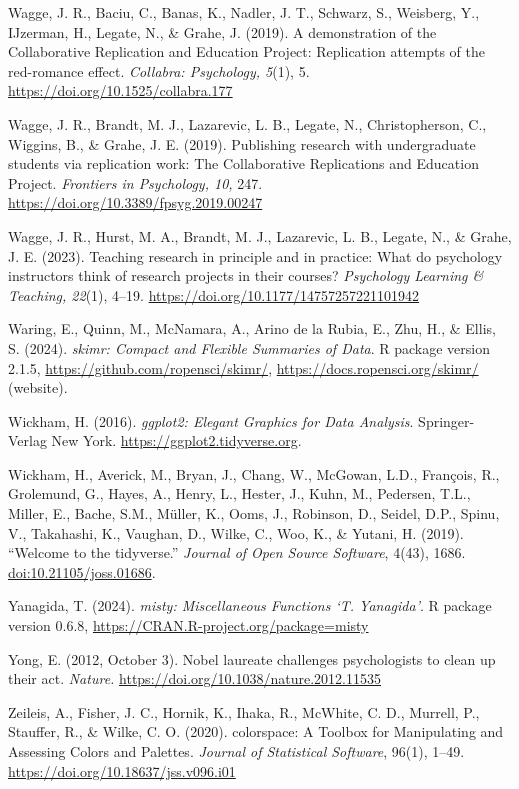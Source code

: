 \documentclass[
]{article}
\begin{document}
Wagge, J. R., Baciu, C., Banas, K., Nadler, J. T., Schwarz, S.,
Weisberg, Y., IJzerman, H., Legate, N., \& Grahe, J. (2019). A
demonstration of the Collaborative Replication and Education Project:
Replication attempts of the red-romance effect. \emph{Collabra:
Psychology, 5}(1), 5. \url{https://doi.org/10.1525/collabra.177}

Wagge, J. R., Brandt, M. J., Lazarevic, L. B., Legate, N.,
Christopherson, C., Wiggins, B., \& Grahe, J. E. (2019). Publishing
research with undergraduate students via replication work: The
Collaborative Replications and Education Project. \emph{Frontiers in
Psychology, 10,} 247. \url{https://doi.org/10.3389/fpsyg.2019.00247}

Wagge, J. R., Hurst, M. A., Brandt, M. J., Lazarevic, L. B., Legate, N.,
\& Grahe, J. E. (2023). Teaching research in principle and in practice:
What do psychology instructors think of research projects in their
courses? \emph{Psychology Learning \& Teaching, 22}(1), 4--19.
\url{https://doi.org/10.1177/14757257221101942}

Waring, E., Quinn, M., McNamara, A., Arino de la Rubia, E., Zhu, H., \&
Ellis, S. (2024). \emph{skimr: Compact and Flexible Summaries of Data}.
R package version 2.1.5, \url{https://github.com/ropensci/skimr/},
\url{https://docs.ropensci.org/skimr/} (website).

Wickham, H. (2016). \emph{ggplot2: Elegant Graphics for Data Analysis}.
Springer-Verlag New York. \url{https://ggplot2.tidyverse.org}.

Wickham, H., Averick, M., Bryan, J., Chang, W., McGowan, L.D., François,
R., Grolemund, G., Hayes, A., Henry, L., Hester, J., Kuhn, M., Pedersen,
T.L., Miller, E., Bache, S.M., Müller, K., Ooms, J., Robinson, D.,
Seidel, D.P., Spinu, V., Takahashi, K., Vaughan, D., Wilke, C., Woo, K.,
\& Yutani, H. (2019). ``Welcome to the tidyverse.'' \emph{Journal of
Open Source Software}, 4(43), 1686. \url{doi:10.21105/joss.01686}.

Yanagida, T. (2024). \emph{misty: Miscellaneous Functions `T.
Yanagida'}. R package version 0.6.8,
\url{https://CRAN.R-project.org/package=misty}

Yong, E. (2012, October 3). Nobel laureate challenges psychologists to
clean up their act. \emph{Nature.}
\url{https://doi.org/10.1038/nature.2012.11535}

Zeileis, A., Fisher, J. C., Hornik, K., Ihaka, R., McWhite, C. D.,
Murrell, P., Stauffer, R., \& Wilke, C. O. (2020). colorspace: A Toolbox
for Manipulating and Assessing Colors and Palettes. \emph{Journal of
Statistical Software}, 96(1), 1--49.
\url{https://doi.org/10.18637/jss.v096.i01}
\end{document}
